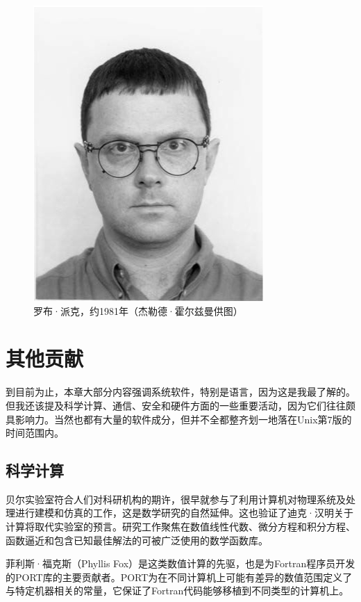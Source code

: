 \documentclass[a4paper,12pt,UTF8,twoside]{ctexbook}
\begin{document}
\begin{figure}[htbp]
	\centering
	\includegraphics[width=0.7\linewidth]{57}
	\caption{罗布·派克，约1981年（杰勒德·霍尔兹曼供图）}
	\label{fig:1}
\end{figure}

\section{其他贡献}

到目前为止，本章大部分内容强调系统软件，特别是语言，因为这是我最了解的。但我还该提及科学计算、通信、安全和硬件方面的一些重要活动，因为它们往往颇具影响力。当然也都有大量的软件成分，但并不全都整齐划一地落在Unix第7版的时间范围内。

\subsection{科学计算}

贝尔实验室符合人们对科研机构的期许，很早就参与了利用计算机对物理系统及处理进行建模和仿真的工作，这是数学研究的自然延伸。这也验证了迪克·汉明关于计算将取代实验室的预言。研究工作聚焦在数值线性代数、微分方程和积分方程、函数逼近和包含已知最佳解法的可被广泛使用的数学函数库。

菲利斯·福克斯（Phyllis Fox）是这类数值计算的先驱，也是为Fortran程序员开发的PORT库的主要贡献者。PORT为在不同计算机上可能有差异的数值范围定义了与特定机器相关的常量，它保证了Fortran代码能够移植到不同类型的计算机上。
\end{document}
